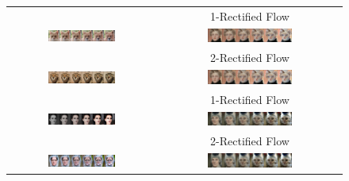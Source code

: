 \begin{figure}[h]
\centering
\setlength{\tabcolsep}{1pt}
\renewcommand\arraystretch{0.4}
\begin{tabular}{cc}
     & \scriptsize{1-Rectified Flow} \\
     \includegraphics[width=0.48\textwidth]{arxiv_figures/trajectory/image_1.png} &
     \includegraphics[width=0.48\textwidth]{arxiv_figures/trajectory/image_5.png}
     \\
     & \scriptsize{2-Rectified Flow} \\
     \includegraphics[width=0.48\textwidth]{arxiv_figures/trajectory/image_2.png} & 
     \includegraphics[width=0.48\textwidth]{arxiv_figures/trajectory/image_6.png}
     \\
     & \scriptsize{1-Rectified Flow} \\
     \includegraphics[width=0.48\textwidth]{arxiv_figures/trajectory/image_3.png} & 
     \includegraphics[width=0.48\textwidth]{arxiv_figures/trajectory/image_7.png}
     \\
     & \scriptsize{2-Rectified Flow} \\
     \includegraphics[width=0.48\textwidth]{arxiv_figures/trajectory/image_4.png} & 
     \includegraphics[width=0.48\textwidth]{arxiv_figures/trajectory/image_8.png}

\end{tabular}
\end{figure}
